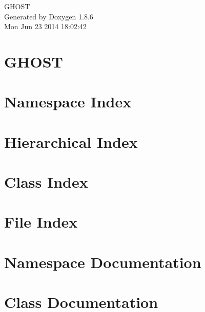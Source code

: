 \documentclass[twoside]{book}
\newcommand{\clearemptydoublepage}{%
  \newpage{\pagestyle{empty}\cleardoublepage}%
}
\begin{document}
\hypersetup{pageanchor=false}
\begin{titlepage}
\vspace*{7cm}
\begin{center}%
{\Large G\-H\-O\-S\-T }\\
\vspace*{1cm}
{\large Generated by Doxygen 1.8.6}\\
\vspace*{0.5cm}
{\small Mon Jun 23 2014 18:02:42}\\
\end{center}
\end{titlepage}
\clearemptydoublepage
\tableofcontents
\clearemptydoublepage
{}
\hypersetup{pageanchor=true}

\chapter{G\-H\-O\-S\-T}
\label{index}\hypertarget{index}{}
\chapter{Namespace Index}

\chapter{Hierarchical Index}

\chapter{Class Index}

\chapter{File Index}

\chapter{Namespace Documentation}

\chapter{Class Documentation}



















\end{document}
